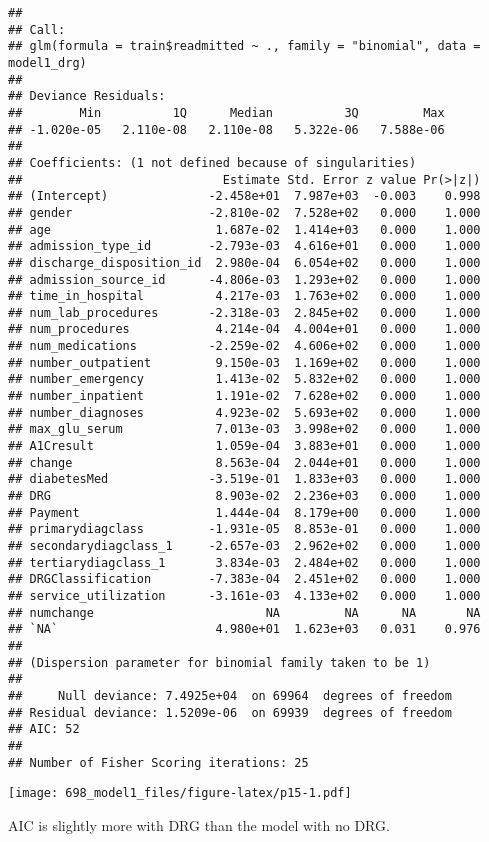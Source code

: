 \documentclass[11pt,]{article}
\begin{document}
\begin{verbatim}
## 
## Call:
## glm(formula = train$readmitted ~ ., family = "binomial", data = model1_drg)
## 
## Deviance Residuals: 
##        Min          1Q      Median          3Q         Max  
## -1.020e-05   2.110e-08   2.110e-08   5.322e-06   7.588e-06  
## 
## Coefficients: (1 not defined because of singularities)
##                            Estimate Std. Error z value Pr(>|z|)
## (Intercept)              -2.458e+01  7.987e+03  -0.003    0.998
## gender                   -2.810e-02  7.528e+02   0.000    1.000
## age                       1.687e-02  1.414e+03   0.000    1.000
## admission_type_id        -2.793e-03  4.616e+01   0.000    1.000
## discharge_disposition_id  2.980e-04  6.054e+02   0.000    1.000
## admission_source_id      -4.806e-03  1.293e+02   0.000    1.000
## time_in_hospital          4.217e-03  1.763e+02   0.000    1.000
## num_lab_procedures       -2.318e-03  2.845e+02   0.000    1.000
## num_procedures            4.214e-04  4.004e+01   0.000    1.000
## num_medications          -2.259e-02  4.606e+02   0.000    1.000
## number_outpatient         9.150e-03  1.169e+02   0.000    1.000
## number_emergency          1.413e-02  5.832e+02   0.000    1.000
## number_inpatient          1.191e-02  7.628e+02   0.000    1.000
## number_diagnoses          4.923e-02  5.693e+02   0.000    1.000
## max_glu_serum             7.013e-03  3.998e+02   0.000    1.000
## A1Cresult                 1.059e-04  3.883e+01   0.000    1.000
## change                    8.563e-04  2.044e+01   0.000    1.000
## diabetesMed              -3.519e-01  1.833e+03   0.000    1.000
## DRG                       8.903e-02  2.236e+03   0.000    1.000
## Payment                   1.444e-04  8.179e+00   0.000    1.000
## primarydiagclass         -1.931e-05  8.853e-01   0.000    1.000
## secondarydiagclass_1     -2.657e-03  2.962e+02   0.000    1.000
## tertiarydiagclass_1       3.834e-03  2.484e+02   0.000    1.000
## DRGClassification        -7.383e-04  2.451e+02   0.000    1.000
## service_utilization      -3.161e-03  4.133e+02   0.000    1.000
## numchange                        NA         NA      NA       NA
## `NA`                      4.980e+01  1.623e+03   0.031    0.976
## 
## (Dispersion parameter for binomial family taken to be 1)
## 
##     Null deviance: 7.4925e+04  on 69964  degrees of freedom
## Residual deviance: 1.5209e-06  on 69939  degrees of freedom
## AIC: 52
## 
## Number of Fisher Scoring iterations: 25
\end{verbatim}

\texttt{[image: 698\_model1\_files/figure-latex/p15-1.pdf]}

AIC is slightly more with DRG than the model with no DRG.
\end{document}

